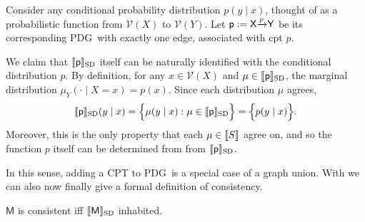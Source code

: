 \documentclass{article}
\newcommand\SD{_{\text{SD}}}
\def\sheq{\!=\!}
\newcommand{\V}{\mathcal V}
\newcommand{\sfM}{\mathsf M}
\newcommand{\MN}{PDG}
\numberwithin{equation}{section}
\begin{document}
	\begin{example}
		Consider any conditional probability distribution $p(y \mid x)$, thought of as a probabilistic function from $\V(X)$ to $\V(Y)$. Let $\sf p:= X \smash{\xrightarrow{p}} Y$ be its corresponding \MN\ with exactly one edge, associated with cpt $p$. 
	 
		We claim that $\bbr{\sf p}\SD$ itself can be naturally identified with the conditional distribution $p$. 
		By definition, for any $x \in \V(X)$ and $\mu \in \bbr{\sf p}\SD$, the marginal distribution $\mu_Y(\cdot\mid X\sheq x) = p(x)$. 
		Since each distribution $\mu$ agrees, 
		$$ \bbr{\mathsf p}\SD(y\mid x) = \Big\{ \mu(y \mid x) : \mu \in \bbr{\mathsf p}\SD \Big\} = \Big\{ p(y \mid x) \Big\}. $$
		Moreover, this is the only property that each $\mu \in \llbracket S\rrbracket$ agree on, and so the function $p$ itself can be determined from from $\bbr{\sf p}\SD$.
%
%		
	\end{example}

	In this sense, adding a CPT to \MN\ is a special case of a graph union.
	With  we can also now finally give a formal definition of consistency.
	\begin{defn} \label{def:weak-consistent}
		$\sfM$ is consistent iff $\bbr{\sfM}\SD$ inhabited. %
	\end{defn}
	
\end{document}
